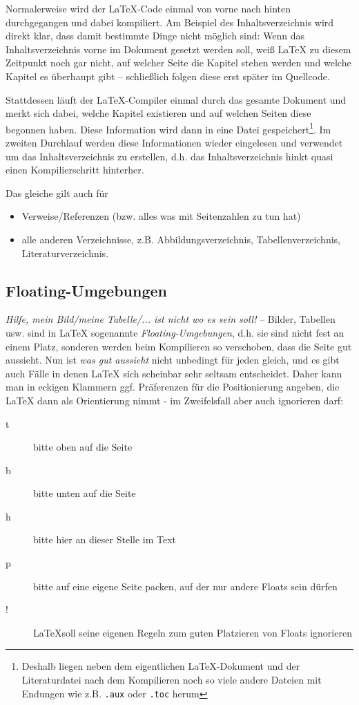 			
			Normalerweise wird der \LaTeX-Code einmal von vorne nach hinten durchgegangen und dabei kompiliert.
%			
			Am Beispiel des Inhaltsverzeichnis wird direkt klar, dass damit bestimmte Dinge nicht möglich sind:
				Wenn das Inhaltsverzeichnis vorne im Dokument gesetzt werden soll, weiß \LaTeX{} zu diesem Zeitpunkt noch gar nicht, auf welcher Seite die Kapitel stehen werden und welche Kapitel es überhaupt gibt -- schließlich folgen diese erst später im Quellcode.
			
			Stattdessen läuft der \LaTeX-Compiler einmal durch das gesamte Dokument und merkt sich dabei, welche Kapitel existieren und auf welchen Seiten diese begonnen haben.
				Diese Information wird dann in eine Datei gespeichert\footnote{Deshalb liegen neben dem eigentlichen \LaTeX-Dokument und der Literaturdatei nach dem Kompilieren noch so viele andere Dateien mit Endungen wie z.B. \lstinline|.aux| oder \lstinline|.toc| herum}.
%			
			Im zweiten Durchlauf werden diese Informationen wieder eingelesen und verwendet um das Inhaltsverzeichnis zu erstellen, d.h. das Inhaltsverzeichnis hinkt quasi einen Kompilierschritt hinterher.
			\bigskip
			
			\noindent Das gleiche gilt auch für
			\begin{itemize}
			\item Verweise/Referenzen (bzw. alles was mit Seitenzahlen zu tun hat)
			\item alle anderen Verzeichnisse, z.B. Abbildungsverzeichnis, Tabellenverzeichnis, Literaturverzeichnis.
			\end{itemize}
		
		

		
		\subsection{Floating-Umgebungen}\label{sec:wissen:float}
			\textit{Hilfe, mein Bild/meine Tabelle/... ist nicht wo es sein soll!} --
			Bilder, Tabellen usw. sind in \LaTeX{} sogenannte \emph{Floating-Umgebungen}, d.h. sie sind nicht fest an einem Platz, sonderen werden beim Kompilieren so verschoben, dass die Seite gut aussieht.
			Nun ist \emph{was gut aussieht} nicht unbedingt für jeden gleich, und es gibt auch Fälle in denen \LaTeX{} sich scheinbar sehr seltsam entscheidet.
			Daher kann man in eckigen Klammern ggf. Präferenzen für die Positionierung angeben, die \LaTeX{} dann als Orientierung nimmt - im Zweifelsfall aber auch ignorieren darf:
			
			\begin{description}
			\item[t] bitte oben auf die Seite
			\item[b] bitte unten auf die Seite
			\item[h] bitte hier an dieser Stelle im Text
			\item[p] bitte auf eine eigene Seite packen, auf der nur andere Floats sein dürfen
			\item[!] \LaTeX soll seine eigenen Regeln zum guten Platzieren von Floats ignorieren
			\end{description}
		
